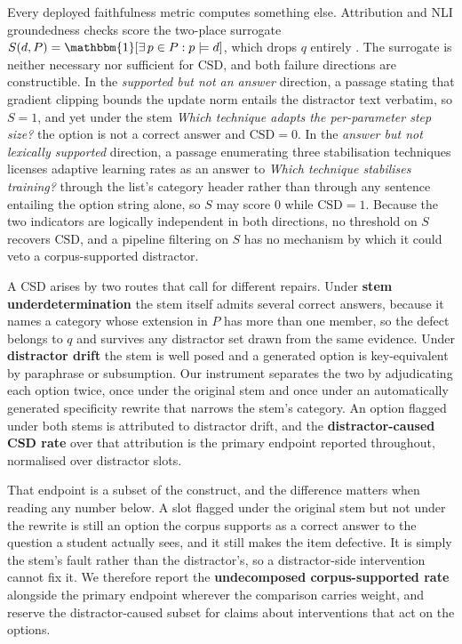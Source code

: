 \documentclass[11pt]{article}
\begin{document}
Every deployed faithfulness metric computes something else. Attribution and NLI groundedness checks score the two-place surrogate $S(d, P) = \mathbbm{1}[\exists\, p \in P : p \models d]$, which drops $q$ entirely \citep{honovich2022true,laban2022summac,es2024ragas}. The surrogate is neither necessary nor sufficient for $\mathrm{CSD}$, and both failure directions are constructible. In the \emph{supported but not an answer} direction, a passage stating that gradient clipping bounds the update norm entails the distractor text verbatim, so $S = 1$, and yet under the stem \emph{Which technique adapts the per-parameter step size?} the option is not a correct answer and $\mathrm{CSD} = 0$. In the \emph{answer but not lexically supported} direction, a passage enumerating three stabilisation techniques licenses adaptive learning rates as an answer to \emph{Which technique stabilises training?} through the list's category header rather than through any sentence entailing the option string alone, so $S$ may score 0 while $\mathrm{CSD} = 1$. Because the two indicators are logically independent in both directions, no threshold on $S$ recovers $\mathrm{CSD}$, and a pipeline filtering on $S$ has no mechanism by which it could veto a corpus-supported distractor.

A CSD arises by two routes that call for different repairs. Under \textbf{stem underdetermination} the stem itself admits several correct answers, because it names a category whose extension in $P$ has more than one member, so the defect belongs to $q$ and survives any distractor set drawn from the same evidence. Under \textbf{distractor drift} the stem is well posed and a generated option is key-equivalent by paraphrase or subsumption. Our instrument separates the two by adjudicating each option twice, once under the original stem and once under an automatically generated specificity rewrite that narrows the stem's category. An option flagged under both stems is attributed to distractor drift, and the \textbf{distractor-caused CSD rate} over that attribution is the primary endpoint reported throughout, normalised over distractor slots.

That endpoint is a subset of the construct, and the difference matters when reading any number below. A slot flagged under the original stem but not under the rewrite is still an option the corpus supports as a correct answer to the question a student actually sees, and it still makes the item defective. It is simply the stem's fault rather than the distractor's, so a distractor-side intervention cannot fix it. We therefore report the \textbf{undecomposed corpus-supported rate} alongside the primary endpoint wherever the comparison carries weight, and reserve the distractor-caused subset for claims about interventions that act on the options.
\end{document}
